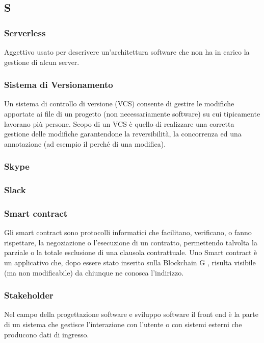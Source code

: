\subsection*{\textbf{\hfill \Huge{S} \hfill}} 
\subsubsection*{Serverless}
Aggettivo usato per descrivere un’architettura software che non ha in carico la gestione di alcun server.
\subsubsection*{Sistema di Versionamento}
Un sistema di controllo di versione (VCS) consente di gestire le modifiche apportate ai file di un progetto (non necessariamente software) su cui tipicamente lavorano più persone. Scopo di un VCS è quello di realizzare una corretta gestione delle modifiche garantendone la reversibilità, la concorrenza ed una annotazione (ad esempio il perché di una modifica).
\subsubsection*{Skype}

\subsubsection*{Slack}

\subsubsection*{Smart contract}
Gli smart contract sono protocolli informatici che facilitano, verificano, o fanno rispettare, la negoziazione o l’esecuzione di un contratto, permettendo talvolta la parziale o la totale esclusione di una clausola contrattuale. Uno Smart contract è un applicativo che, dopo essere stato inserito sulla Blockchain G , risulta visibile (ma non modificabile) da chiunque ne conosca l’indirizzo.
\subsubsection*{Stakeholder}
Nel campo della progettazione software e sviluppo software il front end è la parte di un sistema che gestisce l’interazione con l’utente o con sistemi esterni che producono dati di ingresso.
